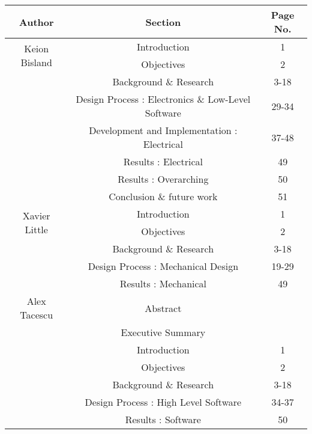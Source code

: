 \renewcommand{\abstractname}{Authorship}
\begin{table}[h]
    \centering
    \begin{tabular}{|c|c|c|}
    \hline
    Author & Section  & Page No.\\
    \hline
     \multirow{2}{*}{Keion Bisland}
      & Introduction & 1\\
      & Objectives & 2\\
      & Background \& Research & 3-18\\
      & Design Process : Electronics \& Low-Level Software & 29-34\\
      & Development and Implementation : Electrical & 37-48\\
      &Results : Electrical & 49\\
      &Results : Overarching  & 50\\
      &Conclusion \& future work  & 51\\




    \hline
     \multirow{2}{*}{Xavier Little}
      & Introduction & 1\\
      & Objectives & 2\\
      & Background \& Research & 3-18\\
      & Design Process : Mechanical Design &19-29\\
      &Results : Mechanical & 49\\

     \hline
     \multirow{1}{*}{Alex Tacescu}
     & Abstract &  \\
     & Executive Summary & \\
     & Introduction & 1\\
     & Objectives & 2\\
     & Background \& Research & 3-18\\
     & Design Process : High Level Software & 34-37\\
     &Results : Software & 50\\

    \hline
    \end{tabular}
   \end{table}
\thispagestyle{empty}
\setcounter{page}{0}

